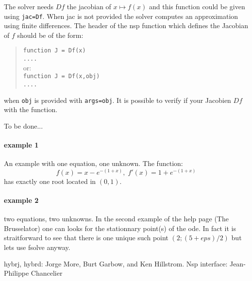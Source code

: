 \begin{mandescription}
The solver needs $Df$ the jacobian of $x \mapsto f(x)$ and this function could be given using 
\verb+jac=Df+. When jac is not provided the solver computes an approximation using finite differences. 
The header of the nsp function which defines the Jacobian of $f$ should be of the form:
\begin{quote}
{\tt function J = Df(x) \\
      ....}\\
or:\\
{\tt function J = Df(x,obj) \\
     ....}
\end{quote}
when {\tt obj} is provided with {\tt args=obj}. It is possible to verify if your Jacobien $Df$ 
with the  function. 

To be done...


\end{mandescription} 

\begin{examples}
  
\paragraph{example 1} An example with one equation, one unknown. The function:
$$
  f(x) = x - e^{-(1+x)}, \; f'(x) = 1 + e^{-(1+x)}
$$ 
has exactly one root located in $(0,1)$.
\begin{program}
\end{program}
 
\paragraph{example 2} two equations, two unknowns. In the second example
of the  help page (The Brusselator) one can looks for
the stationnary point(s) of the ode. In fact it is straitforward to see
that there is one unique such point $(2;(5+eps)/2)$ but lets use fsolve
anyway.
\begin{program}
\end{program}


\end{examples}

\begin{manseealso}
\end{manseealso}

\begin{authors}
 hybrj, hybrd: Jorge More, Burt Garbow, and Ken Hillstrom. Nsp interface: Jean-Philippe Chancelier
\end{authors}
